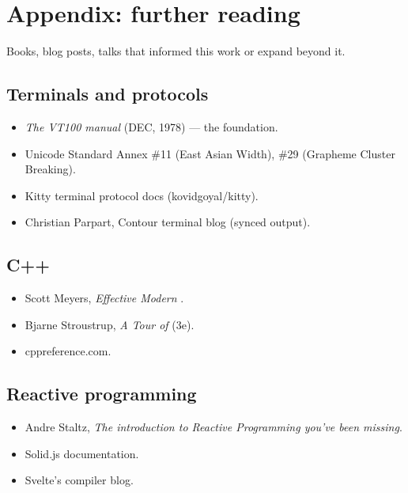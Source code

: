 \chapter{Appendix: further reading}
\label{ch:further}

\begin{aside}
Books, blog posts, talks that informed this work or expand
beyond it.
\end{aside}

\section{Terminals and protocols}

\begin{itemize}[leftmargin=*]
  \item \emph{The VT100 manual} (DEC, 1978) --- the
    foundation.
  \item Unicode Standard Annex \#11 (East Asian Width),
    \#29 (Grapheme Cluster Breaking).
  \item Kitty terminal protocol docs (kovidgoyal/kitty).
  \item Christian Parpart, Contour terminal blog (synced
    output).
\end{itemize}

\section{C++}

\begin{itemize}[leftmargin=*]
  \item Scott Meyers, \emph{Effective Modern \cpp{}}.
  \item Bjarne Stroustrup, \emph{A Tour of \cpp{}} (3e).
  \item cppreference.com.
\end{itemize}

\section{Reactive programming}

\begin{itemize}[leftmargin=*]
  \item Andre Staltz, \emph{The introduction to Reactive
    Programming you've been missing}.
  \item Solid.js documentation.
  \item Svelte's compiler blog.
\end{itemize}

